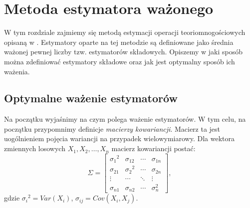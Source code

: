 \chapter{Metoda estymatora ważonego}
\label{weighted_method}
\thispagestyle{chapterBeginStyle}




W tym rozdziale zajmiemy się metodą estymacji operacji teoriomnogościowych opisaną w \cite{ting}. Estymatory oparte na tej metodzie są definiowane jako średnia ważonej pewnej liczby  tzw. estymatorów składowych. Opiszemy w jaki sposób można zdefiniować estymatory składowe oraz jak jest optymalny sposób ich ważenia. 

\section{Optymalne ważenie estymatorów}
Na początku wyjaśnimy na czym polega ważenie estymatorów.
W tym celu, na początku przypomnimy definicje \textit{macierzy kowariancji}. Macierz ta jest uogólnieniem pojęcia wariancji na przypadek wielowymiarowy. Dla wektora zmiennych losowych $X_1, X_2, \ldots, X_n$ macierz kowariancji postać:
\[
\Sigma =
  \begin{bmatrix}
    {{\sigma}_1}^2 & {\sigma}_{12} & \cdots & {\sigma}_{1n}  \\
    {{\sigma}_{21}} & {{\sigma}_{2}}^2 & \cdots & {\sigma}_{2n} \\
    \vdots & \cdots & \ddots & \vdots \\
    {{\sigma}_{n1}} & {{\sigma}_{n2}} & \cdots & {{\sigma}_{n}^2}
  \end{bmatrix},
\]
gdzie
    ${{\sigma}_i}^2 = Var(X_i)$,
    ${\sigma}_{ij} = Cov(X_i, X_j)$.


